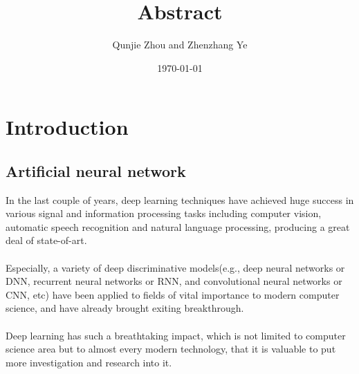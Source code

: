 \documentclass[11pt]{report}
\title{Abstract}
\author{Qunjie Zhou and Zhenzhang Ye}
\date{\today}
\begin{document}
\maketitle
\newpage

\section*{Introduction}
\subsection*{Artificial neural network}
In the last couple of years, deep learning techniques have achieved huge success in various signal and information processing tasks including computer vision, automatic speech recognition and natural language processing, producing a great deal of state-of-art. \\
\\
Especially, a variety of deep discriminative models(e.g.,  deep neural networks or DNN, recurrent neural networks or RNN, and convolutional neural networks or CNN, etc) have been applied to fields of vital importance to modern computer science, and have already brought exiting breakthrough.\\ 
\\
Deep learning has such a breathtaking impact, which is not limited to computer science area but to almost every modern technology, that it is valuable to put more investigation and research into it.
\end{document}
